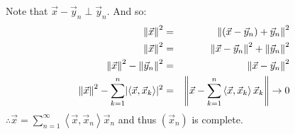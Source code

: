 \documentclass[letterpaper,12pt,fleqn]{article}
\newcommand{\vx}{\vec{x}}
\newcommand{\vy}{\vec{y}}
\newcommand{\norm}[1]{\left\|#1\right\|}
\newcommand{\inner}[1]{\left<#1\right>}
\begin{document}
\begin{theproof}
\begin{description}
    Note that $\vx-\vy_n\perp\vy_n$.
    And so:
    \begin{eqnarray*}
      \norm{\vx}^2 &=& \norm{(\vx-\vy_n)+\vy_n}^2 \\
      \norm{\vx}^2 &=& \norm{\vx-\vy_n}^2+\norm{\vy_n}^2 \\
      \norm{\vx}^2-\norm{\vy_n}^2 &=& \norm{\vx-\vy_n}^2 \\
      \norm{\vx}^2-\sum_{k=1}^n\abs{\inner{\vx,\vx_k}}^2 &=&
      \norm{\vx-\sum_{k=1}^n\inner{\vx,\vx_k}\vx_k}\to0 \\
    \end{eqnarray*}
    $\therefore\vx=\sum_{n=1}^{\infty}\inner{\vx,\vx_n}\vx_n$ and thus $(\vx_n)$
    is complete.
  \end{description}
\end{theproof}
\end{document}
